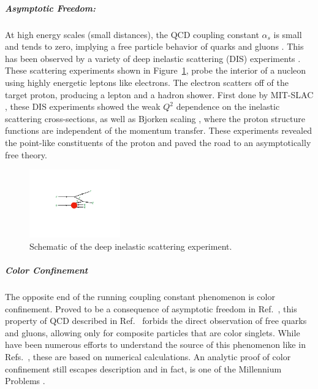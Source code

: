 \subparagraph{Asymptotic Freedom: }
At high energy scales (small distances), the QCD coupling constant $\alpha_s$ is small and tends to zero, implying a free particle behavior of quarks and gluons \cite{PhysRevLett.30.1343, PhysRevD.8.3633}.
This has been observed by a variety of deep inelastic scattering (DIS) experiments \cite{Deur:2014vea, Kim:1998kia, Altarelli:1996nm, RevModPhys.63.597, Kataev:2001kk, Alekhin:2012ig, Alekhin:2013nua, Blumlein:2006be, Aaron:2007xx, Chekanov:2007pa, Chekanov:2008af, Abramowicz:2010cka, Abramowicz:2010ke, Aaron:2009vs}.
These scattering experiments shown in Figure~\ref{fig:dis_schematic}, probe the interior of a nucleon using highly energetic leptons like electrons.
The electron scatters off of the target proton, producing a lepton and a hadron shower.
First done by MIT-SLAC \cite{PhysRevLett.23.930, PhysRevLett.23.935}, these DIS experiments showed the weak $Q^2$ dependence on the inelastic scattering cross-sections, as well as Bjorken scaling \cite{PhysRev.179.1547}, where the proton structure functions are independent of the momentum transfer.
These experiments revealed the point-like constituents of the proton and paved the road to an asymptotically free theory.

\begin{figure}[htbp]
\begin{center}
\includegraphics[width=0.35\textwidth]{figures/theory/DIS}
\caption{Schematic of the deep inelastic scattering experiment.}
\label{fig:dis_schematic}
\end{center}
\end{figure}


\subparagraph{Color Confinement}
The opposite end of the running coupling constant phenomenon is color confinement.
Proved to be a consequence of asymptotic freedom in Ref.~\cite{Nishijima1996}, this property of QCD described in Ref.~\cite{PhysRevD.10.2445} forbids the direct observation of free quarks and gluons, allowing only for composite particles that are color singlets.
While have been numerous efforts to understand the source of this phenomenon like in Refs.~\cite{BUCHMULLER1982479, KOGUT1976199, PhysRevD.31.2910, PhysRevD.57.2603, PhysRevD.62.114503, RevModPhys.55.775, PhysRevLett.90.102001}, these are based on numerical calculations.
An analytic proof of color confinement still escapes description and in fact, is one of the Millennium Problems \cite{MillenniumProb}.


